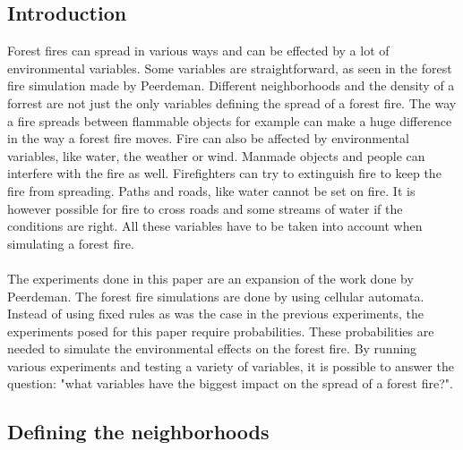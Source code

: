 \documentclass{article}
\begin{document}
\begin{multicols}{2}

\subsection*{Introduction}
Forest fires can spread in various ways and can be effected by a lot of environmental variables. Some variables are straightforward, as seen in the forest fire simulation made by Peerdeman\cite{oldcode}. Different neighborhoods and the density of a forrest are not just the only variables defining the spread of a forest fire. The way a fire spreads between flammable objects for example can make a huge difference in the way a forest fire moves. Fire can also be affected by environmental variables, like water, the weather or wind. Manmade objects and people can interfere with the fire as well. Firefighters can try to extinguish fire to keep the fire from spreading. Paths and roads, like water cannot be set on fire. It is however possible for fire to cross roads and some streams of water if the conditions are right. All these variables have to be taken into account when simulating a forest fire.\\\\
The experiments done in this paper are an expansion of the work done by Peerdeman\cite{oldcode}. The forest fire simulations are done by using cellular automata. Instead of using fixed rules as was the case in the previous experiments, the experiments posed for this paper require probabilities. These probabilities are needed to simulate the environmental effects on the forest fire. By running various experiments and testing a variety of variables, it is possible to answer the question: "what variables have the biggest impact on the spread of a forest fire?".

\subsection*{Defining the neighborhoods}

\end{multicols}
\end{document}
